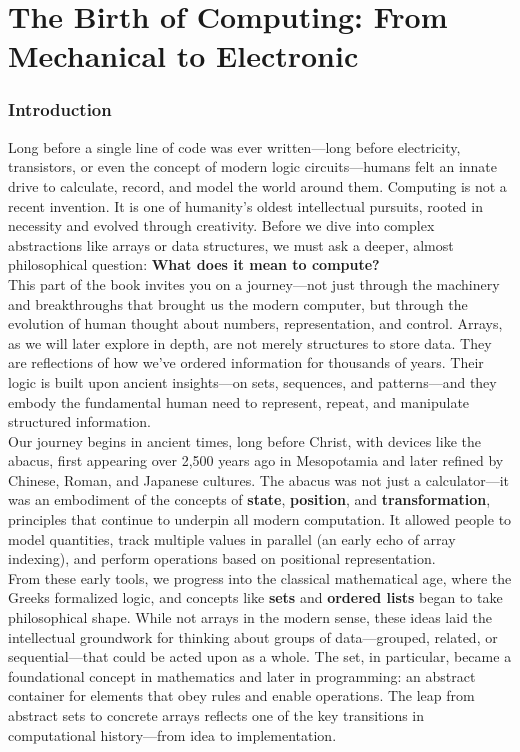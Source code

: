 \documentclass[12pt, oneside]{book}
\begin{document}
	\mainmatter

\part{The Birth of Computing: From Mechanical to Electronic}
\section*{Introduction}

Long before a single line of code was ever written—long before electricity, transistors, or even the concept of modern logic circuits—humans felt an innate drive to calculate, record, and model the world around them. Computing is not a recent invention. It is one of humanity’s oldest intellectual pursuits, rooted in necessity and evolved through creativity. Before we dive into complex abstractions like arrays or data structures, we must ask a deeper, almost philosophical question: \textbf{What does it mean to compute?}\\
This part of the book invites you on a journey—not just through the machinery and breakthroughs that brought us the modern computer, but through the evolution of human thought about numbers, representation, and control. Arrays, as we will later explore in depth, are not merely structures to store data. They are reflections of how we’ve ordered information for thousands of years. Their logic is built upon ancient insights—on sets, sequences, and patterns—and they embody the fundamental human need to represent, repeat, and manipulate structured information.\\
Our journey begins in ancient times, long before Christ, with devices like the abacus, first appearing over 2,500 years ago in Mesopotamia and later refined by Chinese, Roman, and Japanese cultures. The abacus was not just a calculator—it was an embodiment of the concepts of \textbf{state}, \textbf{position}, and \textbf{transformation}, principles that continue to underpin all modern computation. It allowed people to model quantities, track multiple values in parallel (an early echo of array indexing), and perform operations based on positional representation.\\
From these early tools, we progress into the classical mathematical age, where the Greeks formalized logic, and concepts like \textbf{sets} and \textbf{ordered lists} began to take philosophical shape. While not arrays in the modern sense, these ideas laid the intellectual groundwork for thinking about groups of data—grouped, related, or sequential—that could be acted upon as a whole. The set, in particular, became a foundational concept in mathematics and later in programming: an abstract container for elements that obey rules and enable operations. The leap from abstract sets to concrete arrays reflects one of the key transitions in computational history—from idea to implementation.\\
\end{document}
